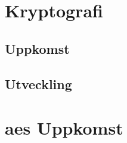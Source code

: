 
\section{Kryptografi} %

\subsection{Uppkomst} %

\subsection{Utveckling} %

\section{\acrshort{aes} Uppkomst} %

